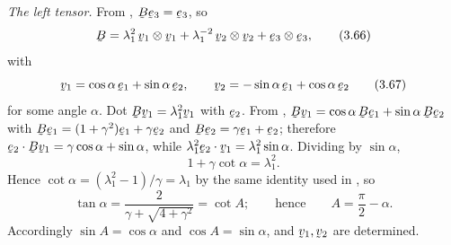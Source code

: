 \smallskip
\noindent\emph{The left tensor.} From , $\bB\be_{3}=\be_{3}$, so
\begin{equation}
   \bB=\lambda_{1}^{2}\,\bv_{1}\otimes\bv_{1}
      +\lambda_{1}^{-2}\,\bv_{2}\otimes\bv_{2}
      +\be_{3}\otimes\be_{3},
   \tag{3.66}\label{eq:3.66}
\end{equation}
with
\begin{equation}
   \bv_{1}=\cos\alpha\,\be_{1}+\sin\alpha\,\be_{2},\qquad
   \bv_{2}=-\sin\alpha\,\be_{1}+\cos\alpha\,\be_{2}
   \tag{3.67}\label{eq:3.67}
\end{equation}
for some angle $\alpha$. Dot $\bB\bv_{1}=\lambda_{1}^{2}\bv_{1}$ with
$\be_{2}$. From , $\bB\bv_{1}=\cos\alpha\,\bB\be_{1}
+\sin\alpha\,\bB\be_{2}$ with $\bB\be_{1}=(1+\gamma^{2})\be_{1}
+\gamma\be_{2}$ and $\bB\be_{2}=\gamma\be_{1}+\be_{2}$; therefore
$\ip{\be_{2}}{\bB\bv_{1}}=\gamma\cos\alpha+\sin\alpha$, while
$\lambda_{1}^{2}\ip{\be_{2}}{\bv_{1}}=\lambda_{1}^{2}\sin\alpha$.
Dividing by $\sin\alpha$,
\begin{equation}
   1+\gamma\cot\alpha=\lambda_{1}^{2}.
   \tag{3.68}\label{eq:3.68}
\end{equation}
Hence $\cot\alpha=(\lambda_{1}^{2}-1)/\gamma=\lambda_{1}$ by the same
identity used in , so
\begin{equation}
   \tan\alpha=\frac{2}{\gamma+\sqrt{4+\gamma^{2}}}=\cot A;
   \qquad\text{hence}\qquad A=\frac{\pi}{2}-\alpha .
   \tag{3.69}\label{eq:3.69}
\end{equation}
Accordingly $\sin A=\cos\alpha$ and $\cos A=\sin\alpha$, and
$\bv_{1},\bv_{2}$ are determined.

